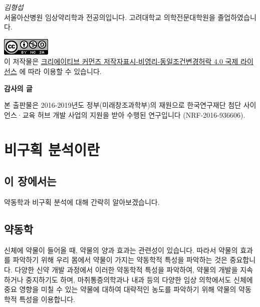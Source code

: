 \documentclass[12pt,]{krantz}
\begin{document}
\emph{김형섭}\\
서울아산병원 임상약리학과 전공의입니다. 고려대학교 의학전문대학원을 졸업하였습니다.

\includegraphics{assets/cc.png}\\
이 저작물은 \href{http://creativecommons.org/licenses/by-nc-sa/4.0/}{크리에이티브 커먼즈 저작자표시-비영리-동일조건변경허락 4.0 국제 라이선스} 에 따라 이용할 수 있습니다.

\textbf{감사의 글}

본 출판물은 2016-2019년도 정부(미래창조과학부)의 재원으로 한국연구재단 첨단 사이언스·교육 허브 개발 사업의 지원을 받아 수행된 연구입니다 (NRF-2016-936606).

\mainmatter

\hypertarget{introduction}{%
\chapter{비구획 분석이란}\label{introduction}}

\hypertarget{summary-introduction}{%
\section{이 장에서는}\label{summary-introduction}}

약동학과 비구획 분석에 대해 간략히 알아보겠습니다.

\hypertarget{PK-introduction}{%
\section{약동학}\label{PK-introduction}}

신체에 약물이 들어올 때, 약물의 양과 효과는 관련성이 있습니다.
따라서 약물의 효과를 파악하기 위해 우리 몸에서 약물이 가지는 약동학적 특성을 파악하는 것은 중요합니다.
다양한 신약 개발 과정에서 이러한 약동학적 특성을 파악하여, 약물의 개발을 지속하거나 중지하기도 하며, 마취통증의학과나 내과 등의 다양한 임상 의학에서도 신체에 중요 영향을 미칠 수 있는 약물에 대하여 대략적인 농도를 파악하기 위해 약물의 약동학적 특성을 이용합니다.
\end{document}
